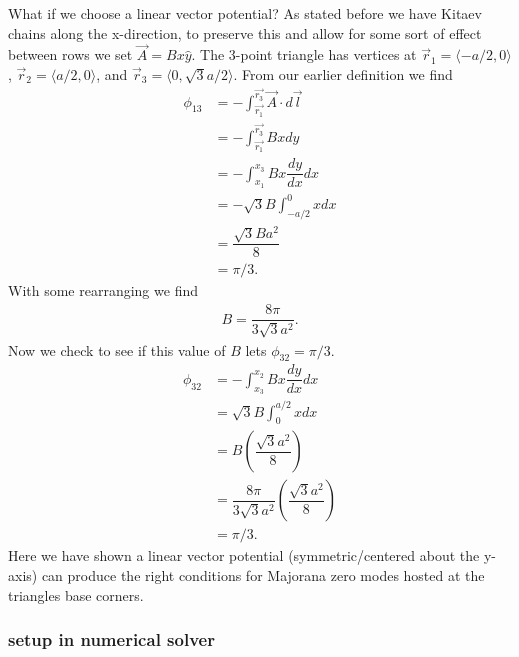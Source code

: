 What if we choose a linear vector potential?
As stated before we have Kitaev chains along the x-direction, to preserve this and allow for some sort of effect between rows we set $\vec{A} = Bx\hat{y}$.
The 3-point triangle has vertices at $\vec{r}_1 = \langle -a/2,0\rangle$, $\vec{r}_2 = \langle a/2,0\rangle$, and $\vec{r}_3 = \langle 0,\sqrt{3}a/2\rangle$.
From our earlier definition we find
\begin{align}
  \phi_{13} &= -\int_{\vec{r_1}}^{\vec{r_3}} \vec{A} \cdot d\vec{l} \nonumber \\
  &= -\int_{\vec{r_1}}^{\vec{r_3}} Bx dy \nonumber \\
  &= -\int_{x_1}^{x_3} Bx \dfrac{dy}{dx} dx \nonumber \\
  &= -\sqrt{3} B \int_{-a/2}^{0} x dx \nonumber \\
  &= \dfrac{\sqrt{3} B a^2}{8}  \nonumber \\
  &= \pi/3. \nonumber
\end{align}
With some rearranging we find
\begin{align}
  B = \dfrac{8 \pi}{3 \sqrt{3} a^2}.
\end{align}
Now we check to see if this value of $B$ lets $\phi_{32} = \pi/3$.
\begin{align}
  \phi_{32} &= -\int_{x_3}^{x_2} Bx \dfrac{dy}{dx} dx \nonumber \\
  &= \sqrt{3} B \int_{0}^{a/2} x dx \nonumber \\
  &= B \left(\dfrac{\sqrt{3} a^2}{8}\right)  \nonumber \\
  &= \dfrac{8 \pi}{3 \sqrt{3} a^2} \left(\dfrac{\sqrt{3} a^2}{8}\right)  \nonumber \\
  &= \pi/3 \nonumber.
\end{align}
Here we have shown a linear vector potential (symmetric/centered about the y-axis) can produce the right conditions for Majorana zero modes hosted at the triangles base corners.

\subsubsection{setup in numerical solver}

